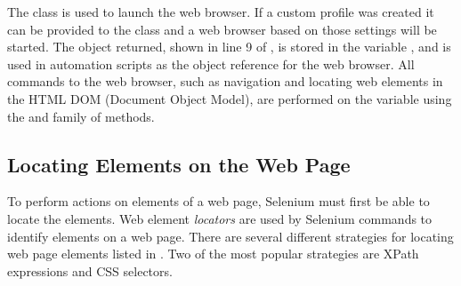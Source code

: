 The  class is used to launch the web browser. If a
custom profile was created it can be provided to the class and a web browser
based on those settings will be started. The object returned, shown in line 9
of , is stored in the variable
, and is used in automation scripts as the object
reference for the web browser. All commands to the web browser, such as
navigation and locating web elements in the HTML DOM (Document Object Model),
are performed on the  variable using the 
and  family of methods.

\subsection{Locating Elements on the Web Page}
\label{ssec:external_libs_selenium_locating_elements}


To perform actions on elements of a web page, Selenium must first be able to
locate the elements. Web element \textit{locators} are used by Selenium commands to
identify elements on a web page.  There are several different strategies for
locating web page elements listed in . Two of the
most popular strategies are XPath expressions and CSS selectors.

